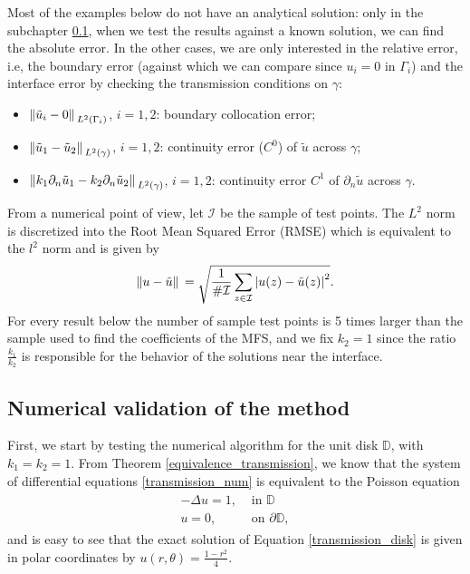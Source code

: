 Most of the examples below do not have an analytical solution: only in the subchapter \ref{transmission_val_subsection}, when we test the results against a known solution, we can find the absolute error. In the other cases, we are only interested in the relative error, i.e, the boundary error (against which we can compare since \(u_i=0\) in \(\Gamma_i\)) and the interface error by checking the transmission conditions on \(\gamma\):
\begin{itemize}
    \item \(\norm*{\tilde{u}_i - 0}_{L^2(\Gamma_i)}\), \(i=1, 2\): boundary collocation error;
    \item \(\norm*{\tilde{u}_1 - \tilde{u}_2}_{L^2(\gamma)}\), \(i=1, 2\): continuity error (\(C^0\)) of \(\tilde{u}\) across \(\gamma\);
    \item \(\norm*{k_1 \partial_n\tilde{u}_1 - k_2 \partial_n\tilde{u}_2}_{L^2(\gamma)}\), \(i=1, 2\): continuity error \(C^1\) of \(\partial_n\tilde{u}\) across \(\gamma\).
\end{itemize}
From a numerical point of view, let \(\mathcal{I}\) be the sample of test points. The \(L^2\) norm is discretized into the Root Mean Squared Error (\ac{RMSE}) which is equivalent to the \(l^2\) norm and is given by
\[
    \norm*{u-\tilde{u}}= \sqrt{\frac{1}{\#\mathcal{I}} \sum_{z \in \mathcal{I}} \abs{u(z)-\tilde{u}(z)}^2}.
\]
For every result below the number of sample test points is 5 times larger than the sample used to find the coefficients of the \ac{MFS}, and we fix \(k_2=1\) since the ratio \(\frac{k_1}{k_2}\) is responsible for the behavior of the solutions near the interface. 

\subsection{Numerical validation of the method}\label{transmission_val_subsection}

First, we start by testing the numerical algorithm for the unit disk \(\mathbb{D}\), with \(k_1=k_2=1\). From Theorem \ref{equivalence_transmission}, we know that the system of differential equations \eqref{transmission_num} is equivalent to the Poisson equation
\begin{align}\label{transmission_disk}
    \begin{split}
        -\Delta u = 1, & \text{ in } \mathbb{D}\\
        u = 0, & \text{ on } \partial\mathbb{D},
    \end{split}
\end{align}
and is easy to see that the exact solution of Equation \eqref{transmission_disk} is given in polar coordinates by \(u(r, \theta) = \frac{1-r^2}{4}\). 

